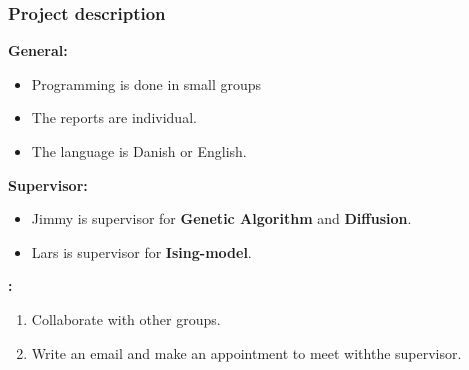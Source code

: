 \documentclass{beamer}
\begin{document}
\frame
{

    \frametitle{Project description}

    \textbf{General:}

    \begin{itemize}

        \item Programming is done in small groups

        \item The reports are individual.

        \item The language is Danish or English.

    \end{itemize}

    \bigskip

    \textbf{Supervisor:}

    \begin{itemize}

        \item Jimmy is supervisor for {\bf Genetic Algorithm} and {\bf Diffusion}.

        \item Lars is supervisor for {\bf Ising-model}.

    \end{itemize}

    \bigskip

    \textbf{:}

    \begin{enumerate}

        \item Collaborate with other groups.

        \item Write an email and make an appointment to meet with\newline the supervisor.

    \end{enumerate}

}


\end{document}

